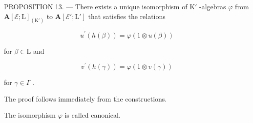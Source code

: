 PROPOSITION 13. --- There exists a unique isomorphism of \(\mathrm{K}'\) -algebras \(\varphi\) from \(\mathbf{A}[\mathcal{E};\mathrm{L}]_{(\mathrm{K}')}\) to \(\mathbf{A}[\mathcal{E}';\mathrm{L}']\) that satisfies the relations

\[
u ^ {\prime} (h (\beta)) = \varphi (1 \otimes u (\beta))\tag{36}
\]

for \(\beta \in \mathrm{L}\) and

\[
v ^ {\prime} (h (\gamma)) = \varphi (1 \otimes v (\gamma))\tag{37}
\]

for \(\gamma\in\Gamma\) .

The proof follows immediately from the constructions.

The isomorphism \(\varphi\) is called canonical.
\relax{}
